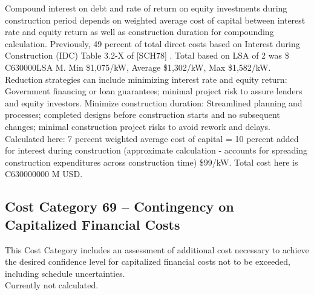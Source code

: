 Compound interest on debt and rate of return on equity investments during construction
period depends on weighted average cost of capital between interest rate and equity  return as well as construction duration for compounding calculation. Previously,  49 percent of total direct costs based on Interest during Construction (IDC) Table 3.2-X of
[SCH78] %
.  Total based on LSA of 2 was \$ C630000LSA M. Min \$1,075/kW, Average \$1,302/kW, Max \$1,582/kW. Reduction strategies can include minimizing interest rate and equity return: Government financing or loan guarantees; minimal project risk to assure lenders and equity investors. Minimize construction duration:  Streamlined planning and processes; completed designs before construction starts and no subsequent  changes; minimal construction project risks to avoid rework and delays.\\

Calculated here: 7 percent weighted average cost of capital = 10 percent added for interest during
construction (approximate calculation - accounts for spreading construction expenditures across construction time) \$99/kW. Total cost here is C630000000 M USD.

\subsection*{Cost Category 69 – Contingency on Capitalized Financial Costs}
This Cost Category includes an assessment of additional cost necessary to achieve the desired confidence level for capitalized financial costs not to be exceeded, including schedule uncertainties.\\

Currently not calculated.



